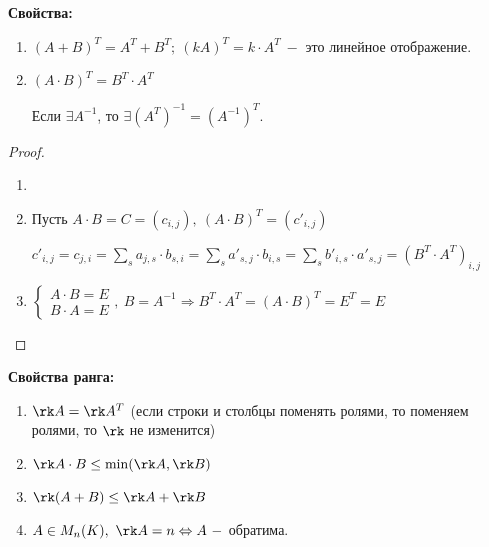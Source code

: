 \begin{statement}
    \textbf{Свойства:}

    \begin{enumerate}
        \item[\circ] $(A+B)^T=A^T+B^T;\ (kA)^T=k\cdot A^T\ -$ это линейное 
отображение.
        \item[\circ] $(A\cdot B)^T=B^T\cdot A^T$

        Если $\exists A^{-1}$, то $\exists (A^T)^{-1}=(A^{-1})^T$.
    \end{enumerate}
\end{statement}

\begin{proof}
    \begin{enumerate}
        \item[]
        \item Пусть $A\cdot B=C=(c_{i,j}),\ (A\cdot B)^T=(c'_{i,j})$

        $c'_{i,j}=c_{j,i}=\sum\limits_{s}a_{j,s}\cdot 
b_{s,i}=\sum\limits_{s}a'_{s,j}\cdot b_{i,s}=\sum\limits_{s}b'_{i,s}\cdot 
a'_{s,j}=(B^T\cdot A^T)_{i,j}$

        \item $\begin{cases} A\cdot B = E \\ B\cdot A = E
        \end{cases},\ B=A^{-1}\Rightarrow B^T\cdot A^T=(A\cdot B)^T=E^T=E$
    \end{enumerate}
\end{proof}

\begin{statement}
    \textbf{Свойства ранга:}

    \begin{enumerate}
        \item $\rk A= \rk A^T$ (если строки и столбцы поменять ролями, то 
поменяем ролями, то $\rk$ не изменится)
        \item $\rk A\cdot B\leq \min(\rk A, \rk B)$
        \item $\rk (A+B)\leq \rk A+ \rk B$
        \item $A\in M_n(K),\ \rk A=n\Leftrightarrow A\ -$ обратима.
    \end{enumerate}
\end{statement}

